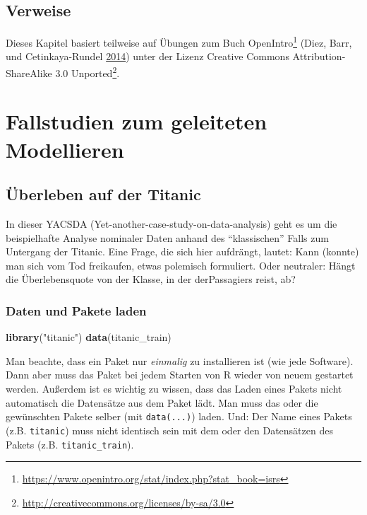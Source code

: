 \documentclass[12pt,ngerman,]{book}
\makeatletter
\newenvironment{Shaded}{\begin{snugshade}}{\end{snugshade}}
\newcommand{\KeywordTok}[1]{\textcolor[rgb]{0.13,0.29,0.53}{\textbf{{#1}}}}
\newcommand{\StringTok}[1]{\textcolor[rgb]{0.31,0.60,0.02}{{#1}}}
\newcommand{\NormalTok}[1]{{#1}}
\let\rmarkdownfootnote\footnote%
\def\footnote{\protect\rmarkdownfootnote}
\renewcommand{\href}[2]{#2\footnote{\url{#1}}}
\newenvironment{kframe}{%
\medskip{}
\setlength{\fboxsep}{.8em}
 \def\at@end@of@kframe{}%
 \ifinner\ifhmode%
  \def\at@end@of@kframe{\end{minipage}}%
  \begin{minipage}{\columnwidth}%
 \fi\fi%
 \def\FrameCommand##1{\hskip\@totalleftmargin \hskip-\fboxsep
 \colorbox{shadecolor}{##1}\hskip-\fboxsep
     \hskip-\linewidth \hskip-\@totalleftmargin \hskip\columnwidth}%
 \MakeFramed {\advance\hsize-\width
   \@totalleftmargin\z@ \linewidth\hsize
   \@setminipage}}%
 {\par\unskip\endMakeFramed%
 \at@end@of@kframe}
\renewenvironment{Shaded}{\begin{kframe}}{\end{kframe}}
\makeatother
\begin{document}
\section{Verweise}\label{verweise-7}

Dieses Kapitel basiert teilweise auf Übungen zum Buch
\href{https://www.openintro.org/stat/index.php?stat_book=isrs}{OpenIntro}
(Diez, Barr, und Cetinkaya-Rundel
\protect\hyperlink{ref-introstats}{2014}) unter der Lizenz
\href{http://creativecommons.org/licenses/by-sa/3.0}{Creative Commons
Attribution-ShareAlike 3.0 Unported}.

\chapter{Fallstudien zum geleiteten
Modellieren}\label{fallstudien-zum-geleiteten-modellieren}

\section{Überleben auf der Titanic}\label{uberleben-auf-der-titanic}

In dieser YACSDA (Yet-another-case-study-on-data-analysis) geht es um
die beispielhafte Analyse nominaler Daten anhand des ``klassischen''
Falls zum Untergang der Titanic. Eine Frage, die sich hier aufdrängt,
lautet: Kann (konnte) man sich vom Tod freikaufen, etwas polemisch
formuliert. Oder neutraler: Hängt die Überlebensquote von der Klasse, in
der derPassagiers reist, ab?

\subsection{Daten und Pakete laden}\label{daten-und-pakete-laden}

\begin{Shaded}
\begin{Highlighting}[]
\KeywordTok{library}\NormalTok{(}\StringTok{"titanic"}\NormalTok{)}
\KeywordTok{data}\NormalTok{(titanic_train)}
\end{Highlighting}
\end{Shaded}

Man beachte, dass ein Paket nur \emph{einmalig} zu installieren ist (wie
jede Software). Dann aber muss das Paket bei jedem Starten von R wieder
von neuem gestartet werden. Außerdem ist es wichtig zu wissen, dass das
Laden eines Pakets nicht automatisch die Datensätze aus dem Paket lädt.
Man muss das oder die gewünschten Pakete selber (mit \texttt{data(...)})
laden. Und: Der Name eines Pakets (z.B. \texttt{titanic}) muss nicht
identisch sein mit dem oder den Datensätzen des Pakets (z.B.
\texttt{titanic\_train}).
\end{document}
